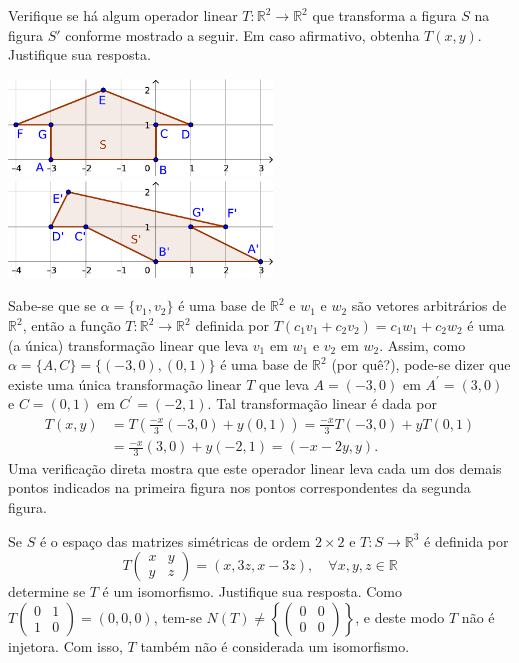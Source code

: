\documentclass[12pt,a4paper]{article}
\newcommand*\R{\mathbb{R}}
\begin{document}
\begin{ExerciseList}
\Exercise[title={2,0}] Verifique se há algum operador linear $T:\R^2 \to \R^2$ que transforma a figura $S$ na figura $S'$ conforme mostrado a seguir. Em caso afirmativo, obtenha $T(x,y)$. Justifique sua resposta.
\begin{center}
\includegraphics[width=7.0cm]{img/prova-3-pro-plano-1.pdf}
\hspace{1cm}
\includegraphics[width=7.0cm]{img/prova-3-pro-plano-2.pdf}
\end{center}
\Answer Sabe-se que se $\alpha = \{ v_1, v_2 \}$ é uma base de $\R^2$ e $w_1$ e $w_2$ são vetores arbitrários de $\R^2$, então a função $T: \R^2 \to \R^2$ definida por $T(c_1 v_1 + c_2 v_2) = c_1 w_1 + c_2 w_2$ é uma (a única) transformação linear que leva $v_1$ em $w_1$ e $v_2$ em $w_2$. Assim, como $\alpha = \{ A, C \} = \{ (-3,0), (0,1) \}$ é uma base de $\R^2$ (por quê?), pode-se dizer que existe uma única transformação linear $T$ que leva $A = (-3,0)$ em $A^\prime = (3,0)$ e $C=(0,1)$ em $C^\prime = (-2,1)$. Tal transformação linear é dada por
\begin{align*}
T(x,y)
& = T\left( \frac{-x}{3}(-3,0) + y(0,1) \right)
  = \frac{-x}{3} T(-3,0) + yT(0,1)\\
& = \frac{-x}{3} (3,0) + y(-2,1)
  = (-x-2y,y).
\end{align*}
Uma verificação direta mostra que este operador linear leva cada um dos demais pontos indicados na primeira figura nos pontos correspondentes da segunda figura.

\Exercise[title={2,0}] Se $S$ é o espaço das matrizes simétricas de ordem $2 \times 2$ e $T: S \to \R^3$ é definida por
\[
T\begin{pmatrix}
x & y\\y&z
\end{pmatrix} = (x,3z, x-3z), \quad \forall x, y,z \in \R
\]
determine se $T$ é um isomorfismo. Justifique sua resposta.
\Answer Como $T\begin{pmatrix}
0 & 1 \\ 1 & 0
\end{pmatrix} = (0, 0, 0)$, tem-se $N(T) \neq \left\{ \begin{pmatrix}
0 & 0 \\ 0 & 0
\end{pmatrix} \right\}$, e deste modo $T$ não é injetora. Com isso, $T$ também não é considerada um isomorfismo.


\end{ExerciseList}
\end{document}
